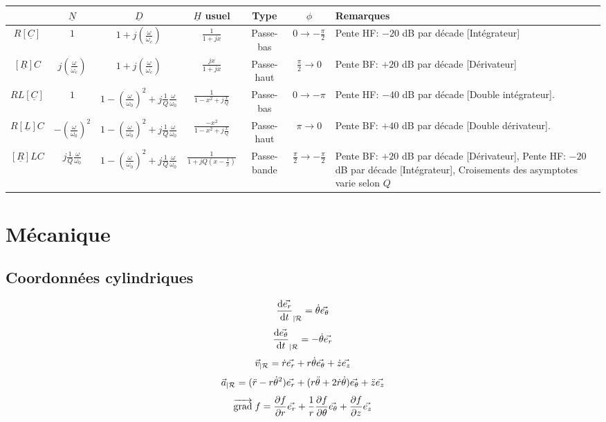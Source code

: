 \documentclass[]{article}
\begin{document}
\scriptsize
\begin{center}
    \renewcommand{\arraystretch}{2}
\begin{tabular}{ |c|c|c|c|c|c|m{5cm}| } 
     \hline
      & $ \underline{N} $ & $ \underline{D} $ & $\underline{H}$ usuel & Type & $ \phi $ & Remarques  \\ 
     \hline \hline
     $R[\underline{C}]$ & $ 1 $ & $ 1 + j(\frac{\omega}{\omega_c}) $ & $ \frac{1}{1 + jx} $ & Passe-bas & $ 0 \rightarrow -\frac{\pi}{2} $ & Pente HF: $-20$ dB par décade [Intégrateur] \\
     \hline
     $[\underline{R}]C$ & $ j(\frac{\omega}{\omega_c}) $ & $ 1 + j(\frac{\omega}{\omega_c}) $ & $ \frac{jx}{1 + jx} $ & Passe-haut & $ \frac{\pi}{2} \rightarrow 0 $ & Pente BF: $+20$ dB par décade [Dérivateur] \\
     \hline
     $RL[\underline{C}]$ & $ 1 $ & $ 1 - (\frac{\omega}{\omega_0})^2 + j\frac{1}{Q}\frac{\omega}{\omega_0} $ & $ \frac{1}{1 - x^2 +  j\frac{x}{Q}} $ & Passe-bas & $ 0 \rightarrow -\pi $ & Pente HF: $-40$ dB par décade [Double intégrateur]. \\
     \hline
     $R[\underline{L}]C$ & $ -(\frac{\omega}{\omega_0}) ^2$ & $ 1 - (\frac{\omega}{\omega_0})^2 + j\frac{1}{Q}\frac{\omega}{\omega_0} $ & $ \frac{-x^2}{1 - x^2 +  j\frac{x}{Q}} $ & Passe-haut & $ \pi \rightarrow 0 $ & Pente BF: $+40$ dB par décade [Double dérivateur]. \\
     \hline
     $[\underline{R}]LC$ & $ j\frac{1}{Q}\frac{\omega}{\omega_0} $ & $ 1 - (\frac{\omega}{\omega_0})^2 + j\frac{1}{Q}\frac{\omega}{\omega_0} $ & $ \frac{1}{1+jQ(x-\frac{1}{x})} $ & Passe-bande & $ \frac{\pi}{2} \rightarrow -\frac{\pi}{2} $ & Pente BF: $+20$ dB par décade [Dérivateur], Pente HF: $-20$ dB par décade [Intégrateur], Croisements des asymptotes varie selon $Q$  \\
     \hline
\end{tabular}
\end{center}
\normalsize

\clearpage

\section{Mécanique}

\subsection*{Coordonnées cylindriques}

\[ \frac{\text{d} \vec{e_r}}{\text{d}t}_{|\mathcal{R}} = \dot{\theta} \vec{e_{\theta}} \]
\[ \frac{\text{d} \vec{e_{\theta}}}{\text{d}t}_{|\mathcal{R}} = -\dot{\theta} \vec{e_{r}} \]
\[ \vec{v}_{|\mathcal{R}} = \dot{r} \vec{e_r} + r \dot{\theta} \vec{e_{\theta}} + \dot{z} \vec{e_z} \]
\[ \vec{a}_{|\mathcal{R}} = (\ddot{r} - r\dot{\theta}^2) \vec{e_r} + (r \ddot{\theta} + 2 \dot{r} \dot{\theta}) \vec{e_{\theta}} + \ddot{z} \vec{e_z} \]
\[ \overrightarrow{{\text{grad}}} \; f = \frac{\partial f}{\partial r} \vec{e_r} + \frac{1}{r} \frac{\partial f}{\partial \theta} \vec{e_\theta} + \frac{\partial f}{\partial z} \vec{e_z} \]
\end{document}
